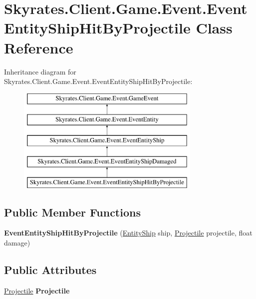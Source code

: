 \hypertarget{class_skyrates_1_1_client_1_1_game_1_1_event_1_1_event_entity_ship_hit_by_projectile}{\section{Skyrates.\-Client.\-Game.\-Event.\-Event\-Entity\-Ship\-Hit\-By\-Projectile Class Reference}
\label{class_skyrates_1_1_client_1_1_game_1_1_event_1_1_event_entity_ship_hit_by_projectile}
}
Inheritance diagram for Skyrates.\-Client.\-Game.\-Event.\-Event\-Entity\-Ship\-Hit\-By\-Projectile\-:\begin{figure}[H]
\begin{center}
\leavevmode
\includegraphics[height=5.000000cm]{class_skyrates_1_1_client_1_1_game_1_1_event_1_1_event_entity_ship_hit_by_projectile}
\end{center}
\end{figure}
\subsection*{Public Member Functions}
\begin{DoxyCompactItemize}
\item 
\hypertarget{class_skyrates_1_1_client_1_1_game_1_1_event_1_1_event_entity_ship_hit_by_projectile_a9b73d30f666680bdb3bfcfc8c904bf94}{{\bfseries Event\-Entity\-Ship\-Hit\-By\-Projectile} (\hyperlink{class_skyrates_1_1_common_1_1_entity_1_1_entity_ship}{Entity\-Ship} ship, \hyperlink{class_projectile}{Projectile} projectile, float damage)}\label{class_skyrates_1_1_client_1_1_game_1_1_event_1_1_event_entity_ship_hit_by_projectile_a9b73d30f666680bdb3bfcfc8c904bf94}

\end{DoxyCompactItemize}
\subsection*{Public Attributes}
\begin{DoxyCompactItemize}
\item 
\hypertarget{class_skyrates_1_1_client_1_1_game_1_1_event_1_1_event_entity_ship_hit_by_projectile_a2dbbb03868855c43c4f1885835219082}{\hyperlink{class_projectile}{Projectile} {\bfseries Projectile}}\label{class_skyrates_1_1_client_1_1_game_1_1_event_1_1_event_entity_ship_hit_by_projectile_a2dbbb03868855c43c4f1885835219082}

\end{DoxyCompactItemize}
